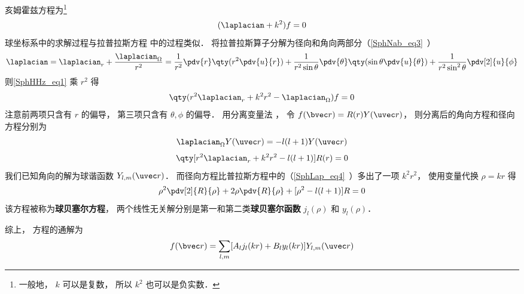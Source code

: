 

亥姆霍兹方程为\footnote{一般地， $k$ 可以是复数， 所以 $k^2$ 也可以是负实数．}
\begin{equation}\label{SphHHz_eq1}
(\laplacian + k^2)f = 0
\end{equation}
球坐标系中的求解过程与拉普拉斯方程 中的过程类似． 将拉普拉斯算子分解为径向和角向两部分（\autoref{SphNab_eq3}~）
\begin{equation}
\laplacian = \laplacian_r + \frac{\laplacian_{\Omega}}{r^2} = \frac{1}{r^2} \pdv{r} \qty(r^2 \pdv{u}{r}) + \frac{1}{r^2\sin\theta}\pdv{\theta} \qty(\sin \theta \pdv{u}{\theta}) + \frac{1}{r^2\sin^2 \theta} \pdv[2]{u}{\phi}
\end{equation}
则\autoref{SphHHz_eq1} 乘 $r^2$ 得
\begin{equation}
\qty(r^2\laplacian_r + k^2 r^2 - \laplacian_\Omega) f = 0
\end{equation}
注意前两项只含有 $r$ 的偏导， 第三项只含有 $\theta,\phi$ 的偏导． 用分离变量法 %
， 令 $f(\bvec r) = R(r) Y(\uvec r)$， 则分离后的角向方程和径向方程分别为
\begin{equation}
\laplacian_{\Omega} Y(\uvec r) = -l(l+1) Y(\uvec r)
\end{equation}
\begin{equation}
\qty[r^2\laplacian_r + k^2 r^2 - l(l+1)] R(r) = 0
\end{equation}
我们已知角向的解为球谐函数 $Y_{l,m}(\uvec r)$． 而径向方程比普拉斯方程中的（\autoref{SphLap_eq4}~）多出了一项 $k^2r^2$， 使用变量代换 $\rho = kr$ 得
\begin{equation}
\rho^2\pdv[2]{R}{\rho} + 2\rho\pdv{R}{\rho} + [\rho^2 - l(l+1)] R = 0
\end{equation}
该方程被称为\textbf{球贝塞尔方程}， 两个线性无关解分别是第一和第二类\textbf{球贝塞尔函数} $j_l(\rho)$ 和 $y_l(\rho)$．

综上， 方程的通解为
\begin{equation}
f(\bvec r) = \sum_{l,m} [A_l j_l(kr) + B_l y_l(kr)] Y_{l,m}(\uvec r)
\end{equation}
